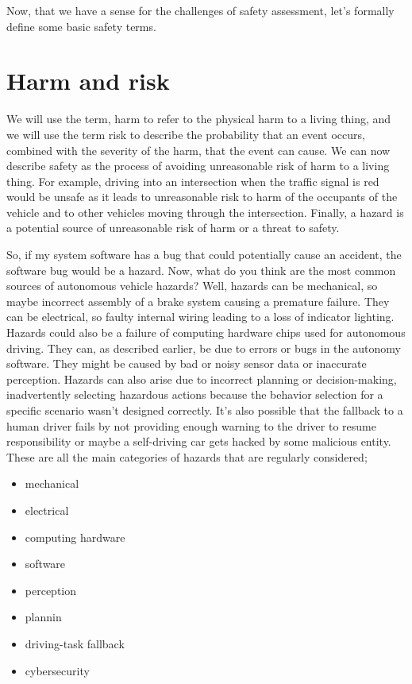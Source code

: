 Now, that we have a sense for the challenges of safety assessment, let's formally define some basic safety terms. 

\section{Harm and risk}
We will use the term, harm to refer to the physical harm to a living thing, and we will use the term risk to 
describe the probability that an event occurs, combined with the severity of the harm, that the event can cause. 
We can now describe safety as the process of avoiding unreasonable risk of harm to a living thing. 
For example, driving into an intersection when the traffic signal is red would be unsafe as it leads to unreasonable risk to harm of 
the occupants of the vehicle and to other vehicles moving through the intersection. 
Finally, a hazard is a potential source of unreasonable risk of harm or a threat to safety. 

So, if my system software has a bug that could potentially cause an accident, the software bug would be a hazard. 
Now, what do you think are the most common sources of autonomous vehicle hazards? 
Well, hazards can be mechanical, so maybe incorrect assembly of a brake system causing a premature failure. 
They can be electrical, so faulty internal wiring leading to a loss of indicator lighting. 
Hazards could also be a failure of computing hardware chips used for autonomous driving. 
They can, as described earlier, be due to errors or bugs in the autonomy software. 
They might be caused by bad or noisy sensor data or inaccurate perception. 
Hazards can also arise due to incorrect planning or decision-making, inadvertently selecting hazardous actions because the behavior selection for a specific scenario wasn't designed correctly. 
It's also possible that the fallback to a human driver fails by not providing enough warning to the driver to resume responsibility or maybe a self-driving car 
gets hacked by some malicious entity. These are all the main categories of hazards that are regularly considered; 

\begin{itemize}
\item mechanical
\item electrical
\item computing hardware
\item software
\item perception
\item plannin
\item driving-task fallback
\item cybersecurity
\end{itemize}

